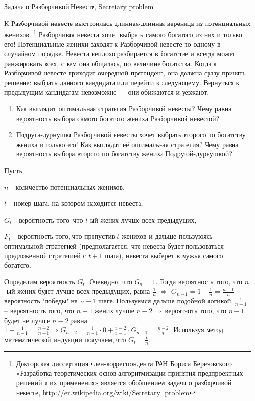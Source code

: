 \documentclass[12pt]{article}
\newcounter{problem}[section]
\newenvironment{problem}%
{%
\refstepcounter{problem}%
     \hypertarget{problem:{\thesection.\theproblem}}{} %
     \Writetofile{solution_file}{\protect\hypertarget{soln:\thesection.\theproblem}{}}
     \begin{myenum}[label=\bfseries\protect\hyperlink{soln:\thesection.\theproblem}{\thesection.\theproblem},ref=\thesection.\theproblem]
     \item%
    }%
    {%
    \end{myenum}}
\begin{document}
\begin{problem}
Задача о Разборчивой Невесте, Secretary problem

К Разборчивой невесте выстроилась длинная-длинная вереница из потенциальных женихов.
\footnote{Докторская диссертация член-корреспондента РАН Бориса Березовского
«Разработка теоретических основ алгоритмизации принятия предпроектных решений и их применения»
является обобщением задачи о разборчивой невесте, \url{http://en.wikipedia.org/wiki/Secretary_problem}}
Разборчивая невеста хочет выбрать самого богатого из них и только его!
Потенциальные женихи заходят к Разборчивой невесте по одному в случайном порядке.
Невеста неплохо разбирается в богатстве и всегда может ранжировать всех, с кем она общалась,
по величине богатства. Когда к Разборчивой невесте приходит очередной претендент,
она должна сразу принять решение: выбрать данного кандидата или перейти к следующему.
Вернуться к предыдущим кандидатам невозможно — они обижаются и уезжают.

\begin{enumerate}
\item Как выглядит оптимальная стратегия Разборчивой невесты? Чему равна вероятность выбора самого богатого жениха Разборчивой невестой?
\item Подруга-дурнушка Разборчивой невесты хочет выбрать второго по богатству жениха и только его!
Как выглядит её оптимальная стратегия?
Чему равна вероятность выбора второго по богатству жениха Подругой-дурнушкой?
\end{enumerate}

\begin{sol}
Пусть:

$n$ - количество потенциальных женихов,

$t$ - номер шага, на котором находится невеста,

$G_t$ - вероятность того, что $t$-ый жених лучше всех предыдущих,

$F_t$ - вероятность того, что пропустив $t$ женихов и дальше пользуюясь оптимальной
стратегией (предполагается, что невеста будет пользоваться предложенной стратегией с $t+1$
шага), невеста выберет в мужья самого богатого.

Определим вероятность $G_t$. Очевидно, что $G_n = 1$. Тогда вероятность того, что $n$-ый жених будет лучше всех предыдущих, равна  $\frac{1}{n}$ $\Rightarrow$ $G_{n-1}=1-\frac{1}{n}=\frac{n-1}{n}$ – вероятность "победы" на $n-1$ шаге. Пользуемся дальше подобной логикой. $\frac{1}{n-1}$ – вероятность того, что $n-1$ жених лучше $n-2\Rightarrow$ вероятноть того, что $n-1$ будет не лучше $n-2$ равна $1-\frac{1}{n-1}=\frac{n-2}{n-1}\Rightarrow G_{n-2}= \frac{1}{n-1}\cdot 0+\frac{n-2}{n-1}\cdot G_{n-1}=\frac{n-2}{n}$. Используя метод математической индукции получаем, что $G_t=\frac{t}{n}$.


\end{sol}
\end{problem}
\end{document}
